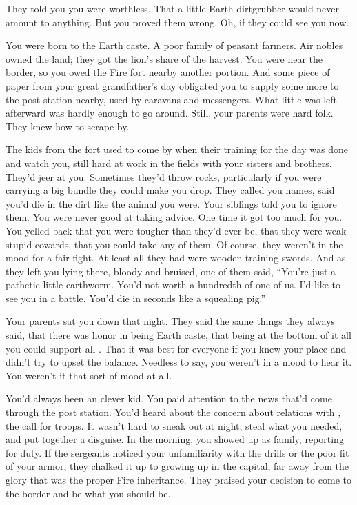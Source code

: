 \documentclass[char]{iron}
\begin{document}
\name{\cMulan{}}

They told you you were worthless.  That a little Earth dirtgrubber would never
amount to anything.  But you proved them wrong.  Oh, if they could see you now.

You were born to the Earth caste.  A poor family of peasant farmers.
Air nobles owned the land; they got the lion's share of the harvest.
You were near the \sMulanCountry{} border, so you owed the Fire fort
nearby another portion.  And some piece of paper from your great
grandfather's day obligated you to supply some more to the post
station nearby, used by caravans and messengers.  What little was left
afterward was hardly enough to go around.  Still, your parents were
hard folk.  They knew how to scrape by.

The kids from the fort used to come by when their training for the day was
done and watch you, still hard at work in the fields with your sisters and
brothers.  They'd jeer at you.  Sometimes they'd throw rocks, particularly
if you were carrying a big bundle they could make you drop.  They called
you names, said you'd die in the dirt like the animal you were.  Your
siblings told you to ignore them.  You were never good at taking advice.
One time it got too much for you.  You yelled back that you were tougher
than they'd ever be, that they were weak stupid cowards, that you could
take any of them.  Of course, they weren't in the mood for a fair fight.
At least all they had were wooden training swords.  And as they left you
lying there, bloody and bruised, one of them said, ``You're just a pathetic
little earthworm.  You'd not worth a hundredth of one of us.  I'd like
to see you in a battle.  You'd die in seconds like a squealing pig.''

Your parents sat you down that night.  They said the same things they
always said, that there was honor in being Earth caste, that being at
the bottom of it all you could support all \sHomeCountry{}.  That it
was best for everyone if you knew your place and didn't try to upset
the balance.  Needless to say, you weren't in a mood to hear it.  You
weren't it that sort of mood at all.

You'd always been an clever kid.  You paid attention to the news
that'd come through the post station.  You'd heard about the concern
about relations with \sMulanCountry{}, the call for troops.  It wasn't
hard to sneak out at night, steal what you needed, and put together a
disguise.  In the morning, you showed up as  family, reporting
for duty.  If the sergeants noticed your unfamiliarity with the drills
or the poor fit of your armor, they chalked it up to growing up in the
capital, far away from the glory that was the proper Fire inheritance.
They praised your decision to come to the border and be what you
should be.
\end{document}
